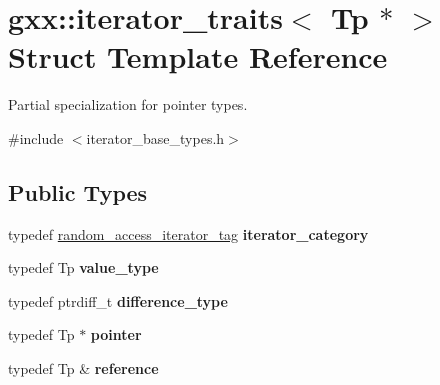 \hypertarget{structgxx_1_1iterator__traits_3_01Tp_01_5_01_4}{}\section{gxx\+:\+:iterator\+\_\+traits$<$ Tp $\ast$ $>$ Struct Template Reference}
\label{structgxx_1_1iterator__traits_3_01Tp_01_5_01_4}


Partial specialization for pointer types.  




{\ttfamily \#include $<$iterator\+\_\+base\+\_\+types.\+h$>$}

\subsection*{Public Types}
\begin{DoxyCompactItemize}
\item 
typedef \hyperlink{structgxx_1_1random__access__iterator__tag}{random\+\_\+access\+\_\+iterator\+\_\+tag} {\bfseries iterator\+\_\+category}\hypertarget{structgxx_1_1iterator__traits_3_01Tp_01_5_01_4_ae9bf0820a4bf89a0b447efbe428c2a28}{}\label{structgxx_1_1iterator__traits_3_01Tp_01_5_01_4_ae9bf0820a4bf89a0b447efbe428c2a28}

\item 
typedef Tp {\bfseries value\+\_\+type}\hypertarget{structgxx_1_1iterator__traits_3_01Tp_01_5_01_4_a4e6dbbb981a5884a241a31ca5c15e2dd}{}\label{structgxx_1_1iterator__traits_3_01Tp_01_5_01_4_a4e6dbbb981a5884a241a31ca5c15e2dd}

\item 
typedef ptrdiff\+\_\+t {\bfseries difference\+\_\+type}\hypertarget{structgxx_1_1iterator__traits_3_01Tp_01_5_01_4_a78a39d5355b07735af56bb35b3e29149}{}\label{structgxx_1_1iterator__traits_3_01Tp_01_5_01_4_a78a39d5355b07735af56bb35b3e29149}

\item 
typedef Tp $\ast$ {\bfseries pointer}\hypertarget{structgxx_1_1iterator__traits_3_01Tp_01_5_01_4_a1cc1e31a8312a2b56934591fd14b6618}{}\label{structgxx_1_1iterator__traits_3_01Tp_01_5_01_4_a1cc1e31a8312a2b56934591fd14b6618}

\item 
typedef Tp \& {\bfseries reference}\hypertarget{structgxx_1_1iterator__traits_3_01Tp_01_5_01_4_a5b951c6f6c6489151f8c2ca25f3af9e3}{}\label{structgxx_1_1iterator__traits_3_01Tp_01_5_01_4_a5b951c6f6c6489151f8c2ca25f3af9e3}

\end{DoxyCompactItemize}


